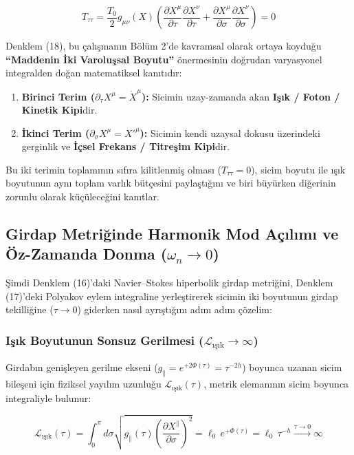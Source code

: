 \documentclass[12pt,a4paper]{article}
\begin{document}
\begin{equation}
T_{\tau\tau} = \frac{T_0}{2} g_{\mu\nu}(X) \left( \frac{\partial X^\mu}{\partial \tau} \frac{\partial X^\nu}{\partial \tau} + \frac{\partial X^\mu}{\partial \sigma} \frac{\partial X^\nu}{\partial \sigma} \right) = 0
\end{equation}

Denklem (18), bu çalışmanın Bölüm 2'de kavramsal olarak ortaya koyduğu \textbf{``Maddenin İki Varoluşsal Boyutu''} önermesinin doğrudan varyasyonel integralden doğan matematiksel kanıtıdır:
\begin{enumerate}
    \item \textbf{Birinci Terim ($\partial_\tau X^\mu = \dot{X}^\mu$):} Sicimin uzay-zamanda akan \textbf{Işık / Foton / Kinetik Kipi}dir.
    \item \textbf{İkinci Terim ($\partial_\sigma X^\mu = X'^\mu$):} Sicimin kendi uzaysal dokusu üzerindeki gerginlik ve \textbf{İçsel Frekans / Titreşim Kipi}dir.
\end{enumerate}

Bu iki terimin toplamının sıfıra kilitlenmiş olması ($T_{\tau\tau} = 0$), sicim boyutu ile ışık boyutunun aynı toplam varlık bütçesini paylaştığını ve biri büyürken diğerinin zorunlu olarak küçüleceğini kanıtlar.

\subsection{Girdap Metriğinde Harmonik Mod Açılımı ve Öz-Zamanda Donma ($\omega_n \to 0$)}

Şimdi Denklem (16)'daki Navier--Stokes hiperbolik girdap metriğini, Denklem (17)'deki Polyakov eylem integraline yerleştirerek sicimin iki boyutunun girdap tekilliğine ($\tau \to 0$) giderken nasıl ayrıştığını adım adım çözelim:

\subsubsection{Işık Boyutunun Sonsuz Gerilmesi ($\mathcal{L}_{\text{ışık}} \to \infty$)}
Girdabın genişleyen gerilme ekseni ($g_{\parallel} = e^{+2\Phi(\tau)} = \tau^{-2h}$) boyunca uzanan sicim bileşeni için fiziksel yayılım uzunluğu $\mathcal{L}_{\text{ışık}}(\tau)$, metrik elemanının sicim boyunca integraliyle bulunur:

\begin{equation}
\mathcal{L}_{\text{ışık}}(\tau) = \int_0^\pi d\sigma \sqrt{g_{\parallel}(\tau) \left(\frac{\partial X^\parallel}{\partial \sigma}\right)^2} = \ell_0 \, e^{+\Phi(\tau)} = \ell_0 \, \tau^{-h} \xrightarrow{\tau \to 0} \infty
\end{equation}
\end{document}

